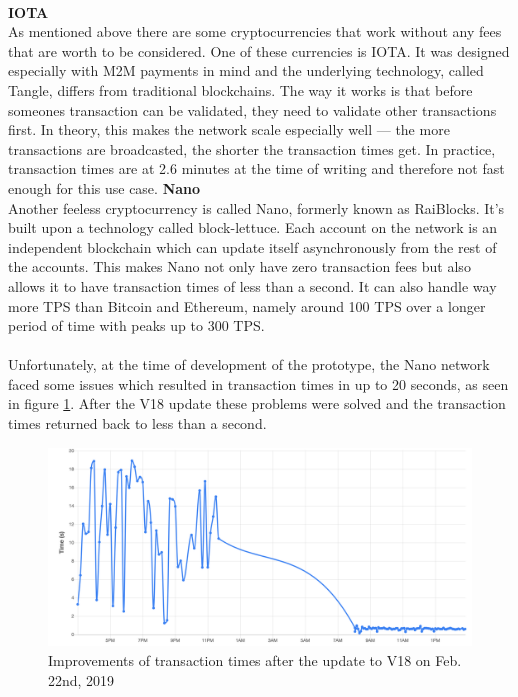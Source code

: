 \leavevmode
\\
\textbf{IOTA}\\
As mentioned above there are some cryptocurrencies that work without any fees that are worth to be considered.
One of these currencies is IOTA.
It was designed especially with M2M payments in mind and the underlying technology, called Tangle, differs from traditional blockchains.
The way it works is that before someones transaction can be validated, they need to validate other transactions first\cite{tangle}.
In theory, this makes the network scale especially well — the more transactions are broadcasted, the shorter the transaction times get.
In practice, transaction times are at 2.6 minutes at the time of writing\cite{iota-time} and therefore not fast enough for this use case.
\newpage
\textbf{Nano}\\
Another feeless cryptocurrency is called Nano, formerly known as RaiBlocks.
It's built upon a technology called block-lettuce.
Each account on the network is an independent blockchain which can update itself asynchronously from the rest of the accounts.
This makes Nano not only have zero transaction fees but also allows it to have transaction times of less than a second.
It can also handle way more TPS than Bitcoin and Ethereum, namely around 100 TPS over a longer period of time with peaks up to 300 TPS\cite{nano-stress-test}.
\\\\
Unfortunately, at the time of development of the prototype, the Nano network faced some issues which resulted in transaction times in up to 20 seconds, as seen in figure \ref{fig:NanoConfirmationTime}.
After the V18 update these problems were solved and the transaction times returned back to less than a second\cite{nano-confirmation-time}.
\begin{figure}[H]
    \includegraphics[width=\textwidth]{img/nano-confirmation-time.png}
    \caption{Improvements of transaction times after the update to V18 on Feb. 22nd, 2019\cite{nano-confirmation-time}}
    \label{fig:NanoConfirmationTime}
\end{figure}
